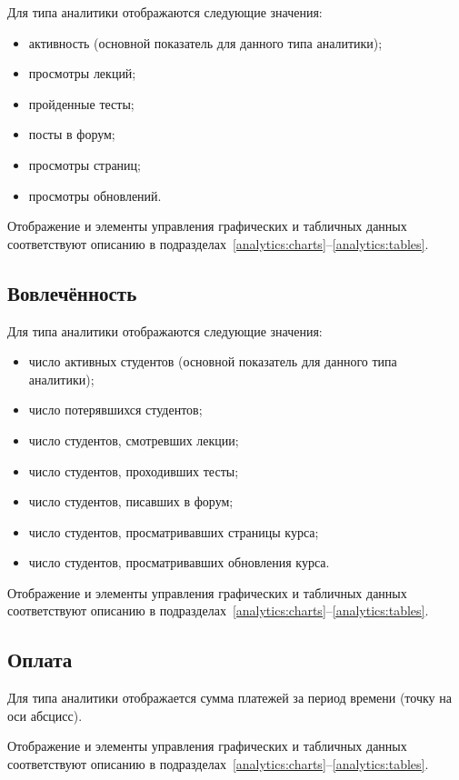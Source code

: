Для типа аналитики  отображаются следующие значения:
\begin{itemize}
	\item активность (основной показатель для данного типа аналитики);
	\item просмотры лекций;
	\item пройденные тесты;
	\item посты в форум;
	\item просмотры страниц;
	\item просмотры обновлений.
\end{itemize}

Отображение и элементы управления графических и табличных данных соответствуют описанию в 
подразделах~\ref{analytics:charts}--\ref{analytics:tables}.

\subsection{Вовлечённость}
\label{analytics:involvement}

Для типа аналитики  отображаются следующие значения:
\begin{itemize}
	\item число активных студентов (основной показатель для данного типа аналитики);
	\item число потерявшихся студентов;
	\item число студентов, смотревших лекции;
	\item число студентов, проходивших тесты;
	\item число студентов, писавших в форум;
	\item число студентов, просматривавших страницы курса;
	\item число студентов, просматривавших обновления курса.
\end{itemize}

Отображение и элементы управления графических и табличных данных соответствуют описанию в 
подразделах~\ref{analytics:charts}--\ref{analytics:tables}.

\subsection{Оплата}
\label{analytics:payments}
Для типа аналитики  отображается сумма платежей за период времени (точку на оси абсцисс).

Отображение и элементы управления графических и табличных данных соответствуют описанию в 
подразделах~\ref{analytics:charts}--\ref{analytics:tables}.

